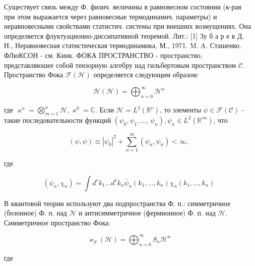 \documentclass[10pt]{article}
\begin{document}
Существует связь между $Ф$. физич. величины в равновесном состоянии (к-рая при этом выражается через равновесные термодинамич. параметры) и неравновесными свойствами статистич. системы при внешних возмущениях. Она определяется флуктуационно-диссипативной теоремой. Лит.: [1] Зу б а р е в Д. Н., Неравновесная статистическая термодинамика, М., 1971. M. A. Сташенко. ФЛюКСОН - см. Кинк. ФОКА ПРОСТРАНСТВО - пространство, представляюшее собой тензорную алгебру над гильбертовым пространством $\mathscr{C}$. Пространство Фока $\mathscr{F}(\mathscr{H})$ определяется следующим образом:



\[

\mathscr{H}(\mathscr{H})=\bigoplus_{n=0}^{\infty} \mathscr{H}^{n}

\]



где $\mathscr{\varkappa}^{n}=\bigotimes_{m=1}^{n} \mathscr{H}, \mathscr{\varkappa}^{0}=\mathbb{C}$. Если $\mathscr{H}=L^{2}\left(\mathbb{R}^{v}\right)$, то элементы $\psi \in \mathscr{F}(\mathscr{C})$ - такие последовательности функций $\left(\psi_{0}, \psi_{1}, \ldots\right.$, $\left.\psi_{n}\right), \psi_{n} \in L^{2}\left(\mathbb{R}^{v n}\right)$, что



\[

(\psi, \psi) \equiv\left|\psi_{0}\right|^{2}+\sum_{n=1}^{\infty}\left(\psi_{n}, \psi_{n}\right)<\infty,

\]



где



\[

\left(\psi_{n}, \chi_{n}\right)=\int d^{v} k_{1} \ldots d^{v} k_{n} \bar{\psi}_{n}\left(k_{1}, \ldots, k_{n}\right) \chi_{n}\left(k_{1}, \ldots, k_{n}\right)

\]



В квантовой теории используют два подпространства Ф. п.: симметричное (бозонное) Ф. п. над $\mathscr{\mathscr { N }}$ и антисимметричное (фермионное) Ф. п. над $\mathscr{H}$. Симметричное пространство Фока:



\[

\mathscr{\varkappa}_{S}(\mathscr{H})=\bigoplus_{n=0}^{\infty} S_{n} \mathscr{H}^{n}

\]



где
\end{document}
